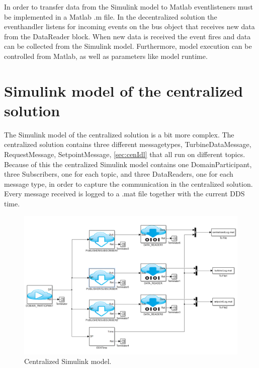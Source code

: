 In order to transfer data from the Simulink model to Matlab eventlisteners must be implemented in a Matlab .m file. In the decentralized solution the eventhandler listens for incoming events on the bus object that receives new data from the DataReader block. When new data is received the event fires and data can be collected from the Simulink model. Furthermore, model execution can be controlled from Matlab, as well as parameters like model runtime.

\section{Simulink model of the centralized solution}\label{subsec:centralizedmodel}
The Simulink model of the centralized solution is a bit more complex. The centralized solution contains three different messagetypes, TurbineDataMessage, RequestMessage, SetpointMessage, \cref{sec:cenIdl} that all run on different topics. Because of this the centralized Simulink model contains one DomainParticipant, three Subscribers, one for each topic, and three DataReaders, one for each message type, in order to capture the communication in the centralized solution. Every message received is logged to a .mat file together with the current DDS time.

\begin{figure}[!h]
\includegraphics[width=\textwidth]{figures/CentralizedModel}
	\caption[Centralized Simulink model]{
		\label{fig:centralizedSimulinkModel} 
		\footnotesize{%
			Centralized Simulink model.
		}
	}
\end{figure}

